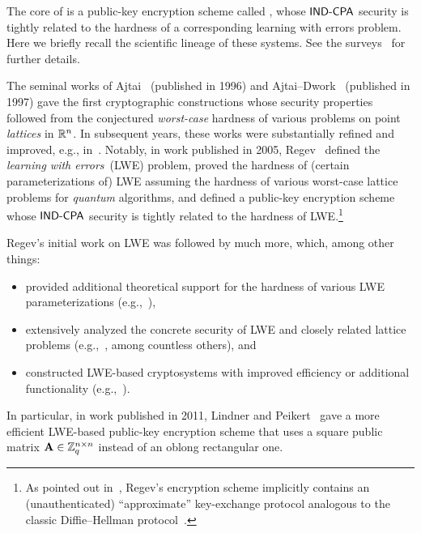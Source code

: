 The core of \FrodoKEM is a public-key encryption scheme called
\FrodoPKE, whose $\textsf{\upshape\mdseries IND-CPA}$ security is tightly related to the
hardness of a corresponding learning with errors problem. Here
we briefly recall the scientific lineage of these systems.  See the
surveys~\cite{Micciancio10,RegevLWESurvey,DBLP:journals/fttcs/Peikert16}
for further details.

The seminal works of Ajtai~\cite{STOC:Ajtai96} (published in 1996) and
Ajtai--Dwork~\cite{STOC:AjtDwo97} (published in 1997) gave the first
cryptographic constructions whose security properties followed from
the conjectured \emph{worst-case} hardness of various problems on
point \emph{lattices} in $\mathbb{R}^{n}$.  In subsequent years, these works were
substantially refined and improved, e.g.,
in~\cite{EPRINT:GolGolHal96a,FOCS:CaiNer97,STOC:Micciancio02,DBLP:journals/jacm/Regev04,DBLP:journals/siamcomp/MicciancioR07}.
Notably, in work published in 2005, Regev~\cite{Reg09} defined the
\emph{learning with errors}~(LWE) problem, proved the hardness of
(certain parameterizations of) LWE assuming the hardness of various
worst-case lattice problems for \emph{quantum} algorithms, and
defined a public-key encryption scheme whose $\textsf{\upshape\mdseries IND-CPA}$ security is
tightly related to the hardness of LWE.\footnote{As pointed out
  in~\cite{TCC:Peikert09_slides}, Regev's encryption scheme implicitly
  contains an (unauthenticated) ``approximate'' key-exchange protocol
  analogous to the classic Diffie--Hellman protocol~\cite{DifHel76}.}

Regev's initial work on LWE was followed by much more, which, among
other things:
\begin{itemize}
\item provided additional theoretical support for the hardness of
  various LWE parameterizations
  (e.g.,~\cite{STOC:Peikert09,C:ACPS09,STOC:BLPRS13,EC:DotMul13,C:MicPei13,STOC:PeiRegSte17}),
\item extensively analyzed the concrete security of LWE and closely
  related lattice problems
  (e.g.,~\cite{MR09:_post_quant_crypt,AC:CheNgu11,RSA:LiuNgu13,ICISC:AlbFitGop13,ChenThesis,EPRINT:ACFP14,PKC:AFFP14,LaarhovenThesis,C:KirFou15,albrecht15:_concrete_lwe,USENIX:ADPS16,CCS:BCDMNN16,EC:Albrecht17,EPRINT:AGVW17},
  among countless others), and
\item constructed LWE-based cryptosystems with improved efficiency or
  additional functionality
  (e.g.,~\cite{STOC:PeiWat08,C:PeiVaiWat08,STOC:GenPeiVai08,JC:CHKP12,FOCS:BraVai11,C:GenSahWat13,EC:BGGHNS14,C:GorVaiWee15}).
\end{itemize}
In particular, in work published in 2011, Lindner and
Peikert~\cite{RSA:LinPei11} gave a more efficient LWE-based public-key
encryption scheme that uses a square public matrix
$\mathbf{A} \in \mathbb{Z}_{q}^{n \times n}$ instead of an oblong rectangular one.

